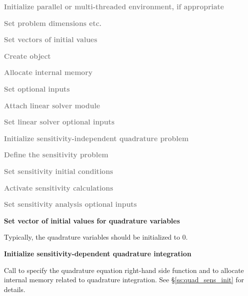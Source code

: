 \begin{Steps}
  
\item 
  \textcolor{gray}{\bf Initialize parallel or multi-threaded environment,
  if appropriate}

\item
  \textcolor{gray}{\bf Set problem dimensions etc.}
  
\item
  \textcolor{gray}{\bf Set vectors of initial values}
 
\item
  \textcolor{gray}{\bf Create {\cvodes} object}

\item
  \textcolor{gray}{\bf Allocate internal memory}

\item
  \textcolor{gray}{\bf Set optional inputs}

\item
  \textcolor{gray}{\bf Attach linear solver module}

\item
  \textcolor{gray}{\bf Set linear solver optional inputs}

\item
  \textcolor{gray}{\bf Initialize sensitivity-independent quadrature problem}

\item\label{i:quad_sens_sens_def}
  \textcolor{gray}{\bf Define the sensitivity problem}

\item
  \textcolor{gray}{\bf Set sensitivity initial conditions}

\item
  \textcolor{gray}{\bf Activate sensitivity calculations}

\item
  \textcolor{gray}{\bf Set sensitivity analysis optional inputs}

\item
  {\bf Set vector of initial values for quadrature variables}

  Typically, the quadrature variables should be initialized to $0$.

\item\label{i:quad_sens_init}
  {\bf Initialize sensitivity-dependent quadrature integration}

  Call  to specify the quadrature equation right-hand
  side function and to allocate internal memory related to quadrature integration. 
  See \S\ref{ss:quad_sens_init} for details.


\end{Steps}
